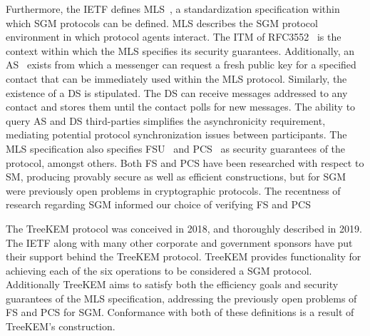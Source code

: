 \documentclass[runningheads]{llncs}
\newcommand{\Abrev}[1]{\gls{#1}}
\begin{document}
Furthermore, the \Abrev{IETF} defines \Abrev{MLS}\ \cite{Omara2020}, a standardization specification within which \Abrev{SGM} protocols can be defined.
\Abrev{MLS} describes the \Abrev{SGM} protocol environment in which protocol agents interact.
The \Abrev{ITM} of RFC3552~\cite{rescorla2003rfc3552} is the context within which the \Abrev{MLS} specifies its security guarantees.
Additionally, an \Abrev{AS}~\cite{perlman1999overview} exists from which a messenger can request a fresh public key for a specified contact that can be immediately used within the \Abrev{MLS} protocol.
Similarly, the existence of a \Abrev{DS} is stipulated. 
The \Abrev{DS} can receive messages addressed to any contact and stores them until the contact polls for new messages.
The ability to query \Abrev{AS} and \Abrev{DS} third-parties simplifies the asynchronicity requirement, mediating potential protocol synchronization issues between participants.
The \Abrev{MLS} specification also specifies \Abrev{FSU}~\cite{Omara2020} and \Abrev{PCS}~\cite{cohn2016post} as security guarantees of the protocol, amongst others.
Both \Abrev{FS} and \Abrev{PCS} have been researched with respect to \Abrev{SM}, producing provably secure as well as efficient constructions, but for \Abrev{SGM} were previously open problems in cryptographic protocols.
The recentness of research regarding \Abrev{SGM} informed our choice of verifying \Abrev{FS} and \Abrev{PCS} 

The TreeKEM protocol \cite{bhargavan:hal-02425247} was conceived in 2018, and thoroughly described in 2019.
The \Abrev{IETF} along with many other corporate and government sponsors have put their support behind the TreeKEM protocol.
TreeKEM provides functionality for achieving each of the six operations to be considered a \Abrev{SGM} protocol.
Additionally TreeKEM aims to satisfy both the efficiency goals and security guarantees of the \Abrev{MLS} specification, addressing the previously open problems of \Abrev{FS} and \Abrev{PCS} for \Abrev{SGM}.
Conformance with both of these definitions is a result of TreeKEM's construction.
\end{document}

